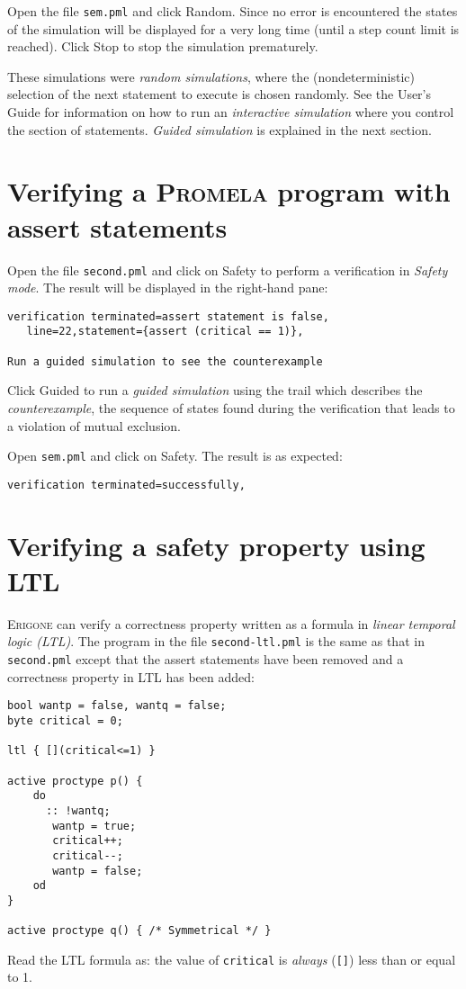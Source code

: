 \documentclass[11pt]{article}
\newcommand*{\prg}{\textsc{Erigone}}
\newcommand*{\prm}{\textsc{Promela}}
\newcommand*{\p}[1]{\texttt{#1}}
\newcommand*{\bu}[1]{\textsf{#1}}
\begin{document}
Open the file \p{sem.pml} and click \bu{Random}. Since no error is
encountered the states of the simulation will be displayed for a very
long time (until a step count limit is reached). Click \bu{Stop} to stop
the simulation prematurely.

These simulations were \emph{random simulations}, where the
(nondeterministic) selection of the next statement to execute is chosen
randomly. See the User's Guide for information on how to run an
\emph{interactive simulation} where you control the section of
statements. \emph{Guided simulation} is explained in the next section.

\section{Verifying a \prm{} program with assert statements}

Open the file \p{second.pml} and click on \bu{Safety} to perform a
verification in \emph{Safety mode}. The result will be displayed in the
right-hand pane:
\begin{verbatim}
verification terminated=assert statement is false,
   line=22,statement={assert (critical == 1)},

Run a guided simulation to see the counterexample
\end{verbatim}

Click \bu{Guided} to run a \emph{guided simulation} using the trail
which describes the \emph{counterexample}, the sequence of states found
during the verification that leads to a violation of mutual exclusion.

Open \p{sem.pml} and click on \bu{Safety}. The result is as expected:
\begin{verbatim}
verification terminated=successfully,
\end{verbatim}

\section{Verifying a safety property using LTL}

\prg{} can verify a correctness property written as a formula in
\emph{linear temporal logic (LTL)}.
The program in the file \p{second-ltl.pml} is the same as that in
\p{second.pml} except that the assert statements have been removed
and a correctness property in LTL has been added:
\begin{verbatim}
bool wantp = false, wantq = false;
byte critical = 0;

ltl { [](critical<=1) }

active proctype p() {
    do 
	  :: !wantq;
       wantp = true;
       critical++;
       critical--;
       wantp = false;
    od
}

active proctype q() { /* Symmetrical */ }
\end{verbatim}
Read the LTL formula as: the value of \p{critical} is \emph{always}
(\p{[]}) less than or equal to 1.
\end{document}
